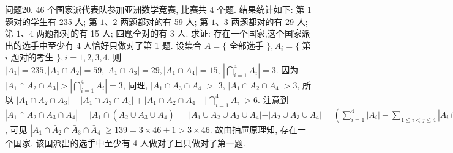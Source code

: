 问题20. 46 个国家派代表队参加亚洲数学竞赛, 比赛共 4 个题.
结果统计如下: 第 1 题对的学生有 235 人; 第 $1 、 2$ 两题都对的有 59 人; 第 $1 、 3$ 两题都对的有 29 人; 第 $1 、 4$ 两题都对的有 15 人; 四题全对的有 3 人.
求证: 存在一个国家,这个国家派出的选手中至少有 4 人恰好只做对了第 1 题.
设集合 $A=\{$ 全部选手 $\}, A_i=\{$ 第 $i$ 题对的考生 $\}, i=1,2,3,4$. 则 $\left|A_1\right|=235,\left|A_1 \cap A_2\right|=59,\left|A_1 \cap A_3\right|=29,\left|A_1 \cap A_4\right|=15$, $\left|\bigcap_{i=1}^4 A_i\right|=3$. 因为 $\left|A_1 \cap A_2 \cap A_3\right|>\left|\bigcap_{i=1}^4 A_i\right|=3$, 同理, $\left|A_1 \cap A_3 \cap A_4\right|>$ 3, $\left|A_1 \cap A_2 \cap A_4\right|>3$, 所以 $\left|A_1 \cap A_2 \cap A_3\right|+\left|A_1 \cap A_3 \cap A_4\right|+\mid A_1 \cap A_2 \cap A_4|-| \bigcap_{i=1}^4 A_i \mid>6$. 注意到 $\left|A_1 \cap \bar{A}_2 \cap \bar{A}_3 \cap \bar{A}_4\right|=\mid A_1 \cap \left(\overline{A_2 \cup A_3 \cup A_4}\right)|=| A_1 \cup A_2 \cup A_3 \cup A_4|-| A_2 \cup A_3 \cup A_4 \mid= \left(\sum_{i=1}^4\left|A_i\right|-\sum_{1 \leqslant i<j \leqslant 4}\left|A_i \cap A_j\right|+\sum_{1 \leqslant i<j<k \leqslant 4}\left|A_i \cap A_j \cap A_k\right|-\left|\bigcap_{i=1}^4 A_i\right|\right)- \left(\sum_{i=2}^4\left|A_i\right|-\sum_{2 \leqslant i<j \leqslant 4}\left|A_i \cap A_j\right|+\left|\bigcap_{i=2}^4 A_i\right|\right)=\left|A_1\right|-\left|A_1 \cap A_2\right|-\mid A_1 \cap A_3|-| A_1 \cap A_4|+| A_1 \cap A_2 \cap A_3|+| A_1 \cap A_2 \cap A_4|+| A_1 \cap A_3 \cap A_4 \mid- \left|\bigcap_{i=1}^4 A_i\right|>235-59-29-15+6=138$, 可见 $\left|A_1 \cap \bar{A}_2 \cap \bar{A}_3 \cap \bar{A}_4\right| \geqslant 139=3 \times 46+1>3 \times 46$. 故由抽屉原理知, 存在一个国家, 该国派出的选手中至少有 4 人做对了且只做对了第一题.


